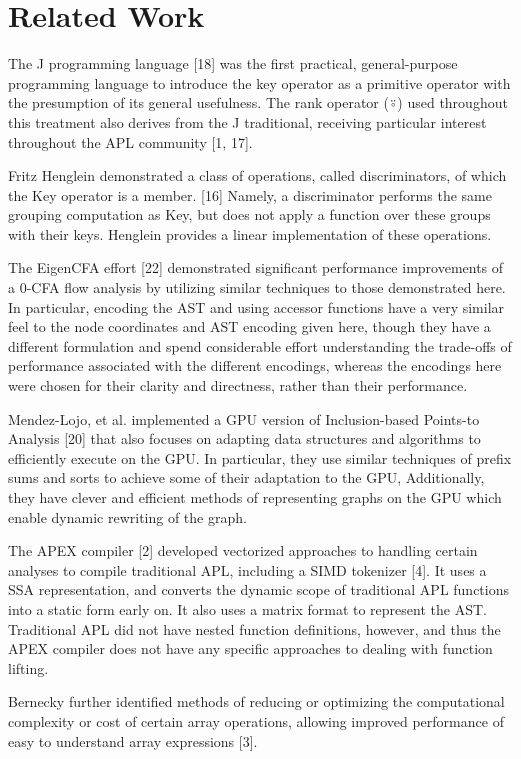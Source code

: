 \documentclass[numbers,preprint]{sigplanconf}
\begin{document}
\section{Related Work}

The J programming language [18] was the first practical, general-purpose programming language 
to introduce the key operator as a primitive operator with the presumption of its general 
usefulness. The rank operator (⍤) used throughout this treatment also derives from the J 
traditional, receiving particular interest throughout the APL community [1, 17]. 

Fritz Henglein demonstrated a class of operations, called discriminators, of which the Key operator 
is a member. [16] Namely, a discriminator performs the same grouping computation as Key, but does 
not apply a function over these groups with their keys. Henglein provides a linear implementation 
of these operations. 

The EigenCFA effort [22] demonstrated significant performance improvements of a 0-CFA flow 
analysis by utilizing similar techniques to those demonstrated here. In particular, encoding the 
AST and using accessor functions have a very similar feel to the node coordinates and AST 
encoding given here, though they have a different formulation and spend considerable effort 
understanding the trade-offs of performance associated with the different encodings, whereas 
the encodings here were chosen for their clarity and directness, rather than their performance. 

Mendez-Lojo, et al. implemented a GPU version of Inclusion-based Points-to Analysis [20] that also 
focuses on adapting data structures and algorithms to efficiently execute on the GPU. In particular, 
they use similar techniques of prefix sums and sorts to achieve some of their adaptation to the GPU, 
Additionally, they have clever and efficient methods of representing graphs on the GPU which enable 
dynamic rewriting of the graph. 

The APEX compiler [2] developed vectorized approaches to handling certain analyses to compile 
traditional APL, including a SIMD tokenizer [4]. It uses a SSA representation, and converts the
dynamic scope of traditional APL functions into a static form early on. It also uses a matrix 
format to represent the AST. Traditional APL did not have nested function definitions, however, 
and thus the APEX compiler does not have any specific approaches to dealing with function lifting.

Bernecky further identified methods of reducing or optimizing the computational complexity or cost 
of certain array operations, allowing improved performance of easy to understand array expressions [3].
\end{document}
